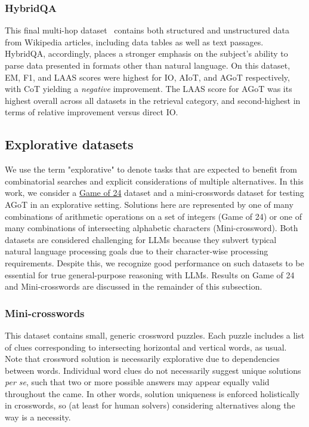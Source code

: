 \documentclass{article}
\begin{document}
\subsubsection{HybridQA}
This final multi-hop dataset~\citep{chen2021hybridqadatasetmultihopquestion} contains both structured and unstructured data from Wikipedia articles, including data tables as well as text passages. HybridQA, accordingly, places a stronger emphasis on the subject's ability to parse data presented in formats other than natural language. On this dataset, EM, F1, and LAAS scores were highest for IO, AIoT, and AGoT respectively, with CoT yielding a \textit{negative} improvement. The LAAS score for AGoT was its highest overall across all datasets in the retrieval category, and second-highest in terms of relative improvement versus direct IO.

\subsection{Explorative datasets}
We use the term "explorative" to denote tasks that are expected to benefit from combinatorial searches and explicit considerations of multiple alternatives. In this work, we consider a \href{https://en.wikipedia.org/wiki/24_(puzzle)}{Game of 24} dataset and a mini-crosswords dataset for testing AGoT in an explorative setting. Solutions here are represented by one of many combinations of arithmetic operations on a set of integers (Game of 24) or one of many combinations of intersecting alphabetic characters (Mini-crossword). Both datasets are considered challenging for LLMs because they subvert typical natural language processing goals due to their character-wise processing requirements. Despite this, we recognize good performance on such datasets to be essential for true general-purpose reasoning with LLMs. Results on Game of 24 and Mini-crosswords are discussed in the remainder of this subsection.

\subsubsection{Mini-crosswords}
This dataset contains small, generic crossword puzzles. Each puzzle includes a list of clues corresponding to intersecting horizontal and vertical words, as usual. Note that crossword solution is necessarily explorative due to dependencies between words. Individual word clues do not necessarily suggest unique solutions \textit{per se}, such that two or more possible answers may appear equally valid throughout the came. In other words, solution uniqueness is enforced holistically in crosswords, so (at least for human solvers) considering alternatives along the way is a necessity.
\end{document}
